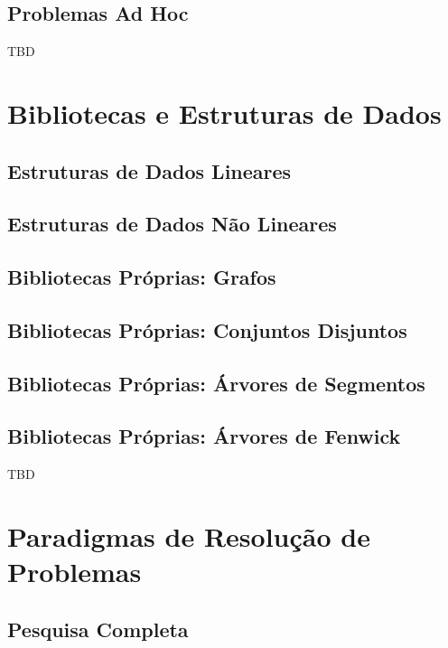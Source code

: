 \documentclass[11pt]{scrartcl}
\begin{document}
\subsection{Problemas Ad Hoc}

TBD

\section{Bibliotecas e Estruturas de Dados}

\subsection{Estruturas de Dados Lineares}

\subsection{Estruturas de Dados Não Lineares}

\subsection{Bibliotecas Próprias: Grafos}

\subsection{Bibliotecas Próprias: Conjuntos Disjuntos}

\subsection{Bibliotecas Próprias: Árvores de Segmentos}

\subsection{Bibliotecas Próprias: Árvores de Fenwick}

TBD

\section{Paradigmas de Resolução de Problemas}

\subsection{Pesquisa Completa}
\end{document}
